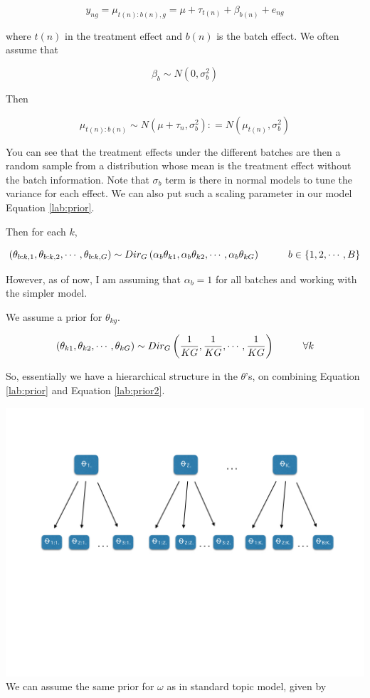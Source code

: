 \documentclass[]{article}
\begin{document}
\[ y_{ng} = \mu_{t(n):b(n),g} = \mu + \tau_{t(n)} + \beta_{b(n)} + e_{ng} \]

where \(t(n)\) in the treatment effect and \(b(n)\) is the batch effect.
We often assume that

\[ \beta_{b} \sim N(0, \sigma^{2}_{b}) \]

Then

\[ \mu_{t(n):b(n)} \sim N (\mu + \tau_{n}, \sigma^{2}_{b})  : = N(\mu_{t(n)}, \sigma^{2}_{b}) \]

You can see that the treatment effects under the different batches are
then a random sample from a distribution whose mean is the treatment
effect without the batch information. Note that \(\sigma_b\) term is
there in normal models to tune the variance for each effect. We can also
put such a scaling parameter in our model Equation \ref{lab:prior}.

Then for each \(k\),

\[ (\theta_{b:k, 1}, \theta_{b:k, 2}, \cdots, \theta_{b:k, G}) \sim Dir_{G} \left ( \alpha_{b} \theta_{k1}, \alpha_{b} \theta_{k2}, \cdots, \alpha_{b} \theta_{kG} \right ) \hspace{1 cm} b \in \{1,2, \cdots, B \} \]

However, as of now, I am assuming that \(\alpha_b =1\) for all batches
and working with the simpler model.

We assume a prior for \(\theta_{kg}\).

\begin{equation}
(\theta_{k1}, \theta_{k2}, \cdots, \theta_{kG}) \sim Dir_{G} \left ( \frac{1}{KG}, \frac{1}{KG}, \cdots, \frac{1}{KG} \right) \hspace{1 cm} \forall k
\label{lab:prior2}
\end{equation}

So, essentially we have a hierarchical structure in the \(\theta\)'s, on
combining Equation \ref{lab:prior} and Equation \ref{lab:prior2}.

\includegraphics{../figs/hierarchy_batch.jpeg} We can assume the same
prior for \(\omega\) as in standard topic model, given by
\end{document}
